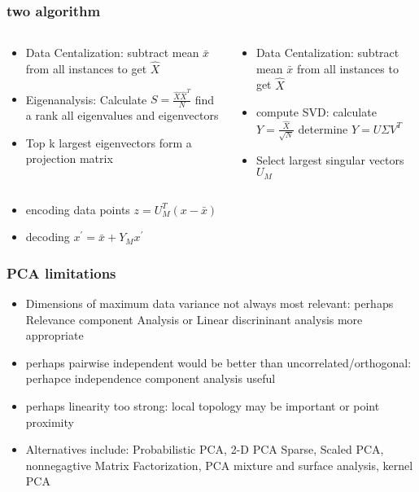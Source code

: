 \documentclass{beamer}
\begin{document}
  \begin{frame}
    \frametitle{two algorithm}
    \begin{columns}
\begin{column}{0.5\textwidth}
  \begin{itemize}
  \item Data Centalization: subtract mean $\bar{x}$ from all instances to get
    $\hat{X}$
  \item Eigenanalysis: Calculate $S=\frac{\hat{X}\hat{X}^T}{N}$ find a rank all eigenvalues and eigenvectors
  \item Top k largest eigenvectors form a projection matrix
  \end{itemize} 
\end{column}
\begin{column}{0.5\textwidth}  %
  \begin{itemize}
 \item Data Centalization: subtract mean $\bar{x}$ from all instances to get $\hat{X}$
 \item compute SVD:  calculate $Y=\frac{\hat{X}}{\sqrt{N}}$ determine $Y=U\Sigma V^T$
 \item Select largest singular vectors $U_M$
  \end{itemize}
\end{column}
\end{columns}
\begin{itemize}
   \item encoding data points  $z=U_M^T (x-\bar{x})$
  \item decoding $x^\prime=\bar{x}+Y_M x^\prime$
\end{itemize}
    
  \end{frame}

  \begin{frame}
    \frametitle{PCA limitations}
    \begin{itemize}
    \item Dimensions of maximum data variance not always most relevant: perhaps  Relevance component Analysis or  Linear discrininant analysis more appropriate
    \item perhaps pairwise independent would be better than uncorrelated/orthogonal: perhapce independence component analysis useful
    \item perhaps linearity too strong: local topology may be important or point proximity
    \item Alternatives include: Probabilistic PCA, 2-D PCA Sparse, Scaled PCA, nonnegagtive Matrix Factorization,  PCA mixture and surface analysis, kernel PCA
    \end{itemize}
  \end{frame}
\end{document}
